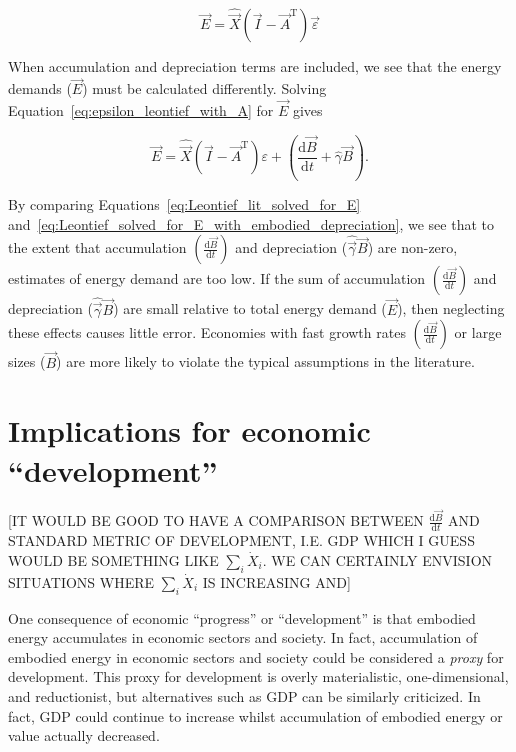 \begin{equation} \label{eq:Leontief_lit_solved_for_E}
	\vec{E} 
	= \hat{\vec{X}}(\vec{I} 
	- \vec{A}^{\mathrm{T}})\vec{\varepsilon}
\end{equation}

When accumulation and depreciation terms are included, 
we see that the energy demands ($\vec{E}$) must be calculated differently. 
Solving Equation~\ref{eq:epsilon_leontief_with_A} 
for $\vec{E}$ gives 

\begin{equation} \label{eq:Leontief_solved_for_E_with_embodied_depreciation}
	\vec{E} = \hat{\vec{X}}(\vec{I} - \vec{A}^{\mathrm{T}})\varepsilon + \left(\frac{\mathrm{d}\vec{B}}{\mathrm{d}t} + \hat{\gamma}\vec{B}\right).
\end{equation}

\noindent{}By comparing Equations~\ref{eq:Leontief_lit_solved_for_E} 
and~\ref{eq:Leontief_solved_for_E_with_embodied_depreciation}, 
we see that to the extent that 
accumulation $\left(\frac{\mathrm{d}\vec{B}}{\mathrm{d}t}\right)$ 
and depreciation ($\hat{\vec{\gamma}}\vec{B}$) 
are non-zero, 
estimates of energy demand are too low. 
If the sum of accumulation 
$\left(\frac{\mathrm{d}\vec{B}}{\mathrm{d}t}\right)$ 
and depreciation ($\hat{\vec{\gamma}}\vec{B}$) 
are small relative to total energy demand ($\vec{E}$), 
then neglecting these effects causes little error. 
Economies with fast growth rates 
$\left(\frac{\mathrm{d}\vec{B}}{\mathrm{d}t}\right)$ 
or large sizes ($\vec{B}$) 
are more likely to violate the typical assumptions in the literature.


\section{Implications for economic ``development''}

[IT WOULD BE GOOD TO HAVE A COMPARISON BETWEEN $\frac{\mathrm{d}\vec{B}}{\mathrm{d}t}$ 
AND STANDARD METRIC OF DEVELOPMENT, 
I.E. GDP WHICH I GUESS WOULD BE SOMETHING LIKE $\sum_{i}\dot{X}_{i}$. 
WE CAN CERTAINLY ENVISION SITUATIONS WHERE $\sum_{i}\dot{X}_{i}$ IS INCREASING AND]

One consequence of economic ``progress'' or ``development'' is that embodied energy accumulates 
in economic sectors and society. 
In fact, accumulation of embodied energy in economic sectors and society 
could be considered a \emph{proxy} for development. 
This proxy for development is overly materialistic, one-dimensional, and reductionist, 
but alternatives such as GDP can be similarly criticized. 
In fact, GDP could continue to increase whilst accumulation 
of embodied energy or value actually decreased.


